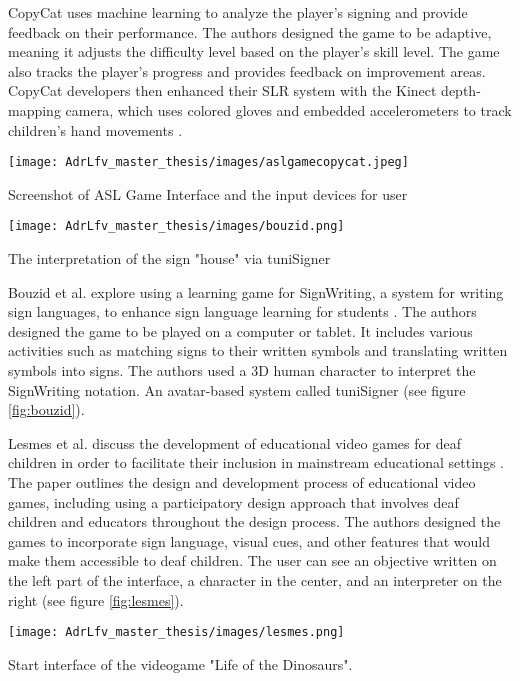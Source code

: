 CopyCat uses machine learning to analyze the player's signing and provide feedback on their performance. The authors designed the game to be adaptive, meaning it adjusts the difficulty level based on the player's skill level. The game also tracks the player's progress and provides feedback on improvement areas.
CopyCat developers then enhanced their SLR system with the Kinect depth-mapping camera, which uses colored gloves and embedded accelerometers to track children's hand movements \cite{zafrulla2011american}.

\begin{marginfigure}
    \centering
    \texttt{[image: AdrLfv\_master\_thesis/images/aslgamecopycat.jpeg]}
    \caption{Screenshot of ASL Game Interface and the input devices for user  }
    \label{fig:aslgamecopycat}
\end{marginfigure}

\begin{marginfigure}
    \centering
    \texttt{[image: AdrLfv\_master\_thesis/images/bouzid.png]}
    \caption{The interpretation of the sign "house" via tuniSigner}
    \label{fig:bouzid}
\end{marginfigure}

Bouzid et al. explore using a learning game for SignWriting, a system for writing sign languages, to enhance sign language learning for students \cite{bouzid2016using}. The authors designed the game to be played on a computer or tablet. It includes various activities such as matching signs to their written symbols and translating written symbols into signs. The authors used a 3D human character to interpret the SignWriting notation. An avatar-based system called tuniSigner \cite{bouzid2013avatar} (see figure \ref{fig:bouzid}).

Lesmes et al. discuss the development of educational video games for deaf children in order to facilitate their inclusion in mainstream educational settings \cite{lesmes2022design}. 
The paper outlines the design and development process of educational video games, including using a participatory design approach that involves deaf children and educators throughout the design process. 
The authors designed the games to incorporate sign language, visual cues, and other features that would make them accessible to deaf children. The user can see an objective written on the left part of the interface, a character in the center, and an interpreter on the right (see figure \ref{fig:lesmes}).

\begin{marginfigure}
    \centering
    \texttt{[image: AdrLfv\_master\_thesis/images/lesmes.png]}
    \caption{Start interface of the videogame "Life of the Dinosaurs".}
    \label{fig:lesmes}
\end{marginfigure}

